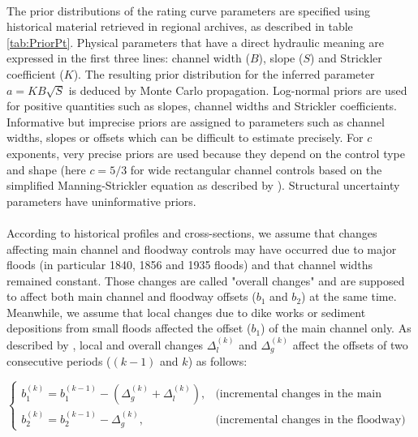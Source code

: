     \paragraph{}
    The prior distributions of the rating curve parameters are specified using historical material retrieved in regional archives, as described in table \ref{tab:PriorPt}. Physical parameters that have a direct hydraulic meaning are expressed in the first three lines: channel width ($B$), slope ($S$) and Strickler coefficient ($K$). The resulting prior distribution for the inferred parameter $a=KB\sqrt S$ is deduced by Monte Carlo propagation. Log-normal priors are used for positive quantities such as slopes, channel widths and Strickler coefficients. Informative but imprecise priors are assigned to parameters such as channel widths, slopes or offsets which can be difficult to estimate precisely. For $c$ exponents, very precise priors are used because they depend on the control type and shape (here $c=5/3$ for wide rectangular channel controls based on the simplified Manning-Strickler equation as described by \citet{le_coz_combining_2014}). Structural uncertainty parameters have uninformative priors.
    \paragraph{}
    According to historical profiles and cross-sections, we assume that changes affecting main channel and floodway controls may have occurred due to major floods (in particular 1840, 1856 and 1935 floods) and that channel widths remained constant. Those changes are called "overall changes" and are supposed to affect both main channel and floodway offsets ($b_1$ and $b_2$) at the same time.
    Meanwhile, we assume that local changes due to dike works or sediment depositions from small floods affected the offset ($b_1$) of the main channel only. As described by \citet{mansanarez_shift_2019}, local and overall changes $\Delta_l^{(k)}$ and $\Delta_g^{(k)}$ affect the offsets of two consecutive periods ($(k-1)$ and $k$) as follows: 
       
       \begin{equation}
          \begin{cases}
           b_1^{(k)} = b_1^{(k-1)}-(\Delta_g^{(k)}+\Delta_l^{(k)}), & \text{(incremental changes in the main channel)}\\
           b_2^{(k)} = b_2^{(k-1)}-\Delta_g^{(k)}, & \text{(incremental changes in the floodway)}
          \end{cases}
          \label{eq:SPD_Pt}
        \end{equation}
       
